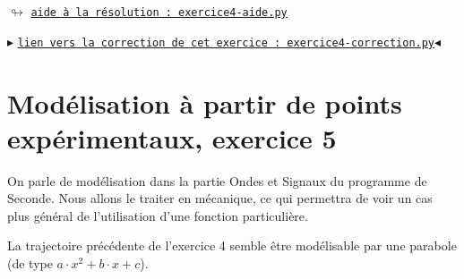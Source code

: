 \documentclass[11pt]{article}
\begin{document}
 
 


\begin{center}
 $\looparrowright$ \href{https://github.com/formationPythonPC-Juin/aides-formation/blob/master/exercice4-aide.py}{\underline{\texttt{aide à la résolution : exercice4-aide.py}}}
\end{center}



\begin{center}
$\blacktriangleright$ \href{https://github.com/formationPythonPC-Juin/corrections-formation/blob/master/exercice4-correction.py}{\underline{\texttt{lien vers la correction de cet exercice : exercice4-correction.py}}}$\blacktriangleleft$                                                                                                                                                                    \end{center}


 

 
 
 
 
 \section{Modélisation à partir de points expérimentaux, exercice 5}

 
 \medskip
 On parle de modélisation dans la partie Ondes et Signaux du programme de Seconde. Nous allons le traiter en mécanique, ce qui permettra de voir un cas plus général de l'utilisation d'une fonction particulière.
 
 \medskip 
La trajectoire précédente de l'exercice 4 semble être modélisable par une parabole (de type $a\cdot x^2+b\cdot x+c$). 
\end{document}
